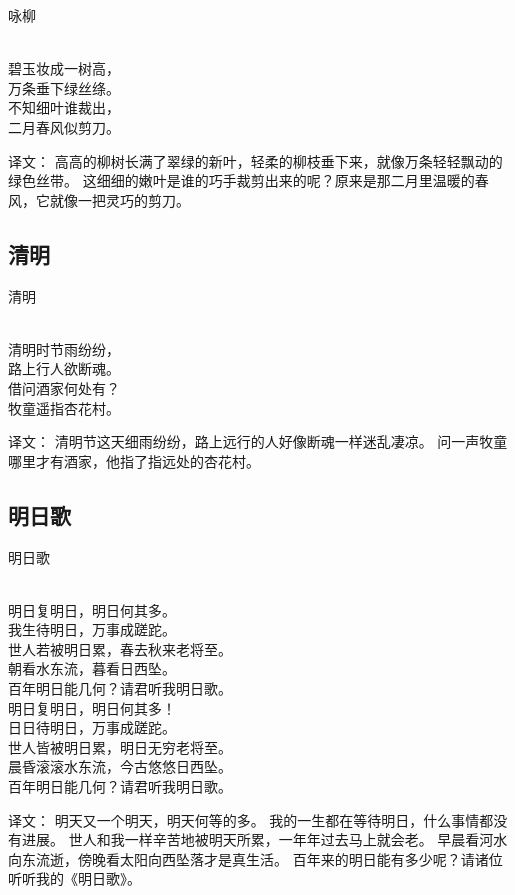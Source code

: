 \noindent 咏柳

  \\

\noindent 碧玉妆成一树高，\\万条垂下绿丝绦。\\
不知细叶谁裁出，\\二月春风似剪刀。

译文：
高高的柳树长满了翠绿的新叶，轻柔的柳枝垂下来，就像万条轻轻飘动的绿色丝带。
这细细的嫩叶是谁的巧手裁剪出来的呢？原来是那二月里温暖的春风，它就像一把灵巧的剪刀。

\subsection{清明}

\noindent 清明

  \\

\noindent 清明时节雨纷纷，\\路上行人欲断魂。\\
借问酒家何处有？\\牧童遥指杏花村。

译文：
清明节这天细雨纷纷，路上远行的人好像断魂一样迷乱凄凉。
问一声牧童哪里才有酒家，他指了指远处的杏花村。

\subsection{明日歌}

\noindent 明日歌

  \\

\noindent 明日复明日，明日何其多。\\
我生待明日，万事成蹉跎。\\
世人若被明日累，春去秋来老将至。\\
朝看水东流，暮看日西坠。\\
百年明日能几何？请君听我明日歌。\\
明日复明日，明日何其多！\\
日日待明日，万事成蹉跎。\\
世人皆被明日累，明日无穷老将至。\\
晨昏滚滚水东流，今古悠悠日西坠。\\
百年明日能几何？请君听我明日歌。

译文：
明天又一个明天，明天何等的多。 我的一生都在等待明日，什么事情都没有进展。 世人和我一样辛苦地被明天所累，一年年过去马上就会老。 早晨看河水向东流逝，傍晚看太阳向西坠落才是真生活。 百年来的明日能有多少呢？请诸位听听我的《明日歌》。

